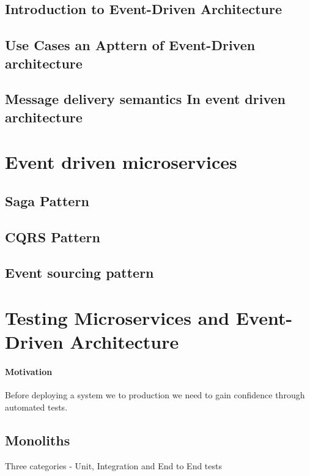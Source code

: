 \subsection{Introduction to Event-Driven Architecture}

\subsection{Use Cases an Apttern of Event-Driven architecture}

\subsection{Message delivery semantics In event driven architecture}

\section{Event driven microservices}

\subsection{Saga Pattern}

\subsection{CQRS Pattern}

\subsection{Event sourcing pattern}

\section{Testing Microservices and Event-Driven Architecture}

\paragraph{Motivation} Before deploying a system we to production we need to gain confidence through automated tests.

\subsection{Monoliths}
Three categories - Unit, Integration and End to End tests

